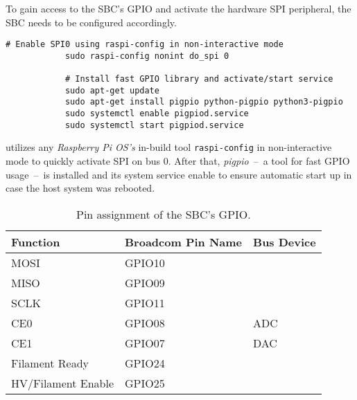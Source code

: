         To gain access to the SBC's GPIO and activate the hardware SPI peripheral, the SBC needs to be configured accordingly.
        \begin{lstlisting}[style=mybash,numbers=none, caption={[Activating SPI0 and installing \texttt{pigpio}]Activating SPI0 and installing \texttt{pigpio}. Enabling the system service ensures automatic start up after boot.},label={lst:SPI0 and pigpio}]
            # Enable SPI0 using raspi-config in non-interactive mode
            sudo raspi-config nonint do_spi 0

            # Install fast GPIO library and activate/start service
            sudo apt-get update
            sudo apt-get install pigpio python-pigpio python3-pigpio
            sudo systemctl enable pigpiod.service
            sudo systemctl start pigpiod.service
        \end{lstlisting}
         utilizes any \textit{Raspberry Pi OS's} in-build tool \texttt{raspi-config} in non-interactive mode to quickly activate SPI on bus 0.
        After that, \textit{pigpio}~--~a tool for fast GPIO usage~--~is installed and its system service enable to ensure automatic start up in case the host system was rebooted.

        \begin{table}[h]
            \centering
            \caption[Pin assignment of the SBC's GPIO]{Pin assignment of the SBC's GPIO.}%
            \label{tab:gpio assignment}
            \begin{tabular}{@{}lll@{}}
                \toprule
                Function&           Broadcom Pin Name&  Bus Device\\
                \midrule
                MOSI&	            GPIO10&\\
                MISO&	            GPIO09&\\
                SCLK&	            GPIO11&\\
                CE0&	            GPIO08&             ADC\\
                CE1&	            GPIO07&             DAC\\
                Filament Ready&     GPIO24&\\
                HV/Filament Enable& GPIO25&\\
                \bottomrule
            \end{tabular}
        \end{table}

